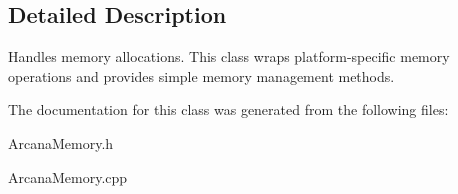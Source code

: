 \subsection{Detailed Description}
Handles memory allocations. This class wraps platform-\/specific memory operations and provides simple memory management methods. 

The documentation for this class was generated from the following files\+:\begin{DoxyCompactItemize}
\item 
Arcana\+Memory.\+h\item 
Arcana\+Memory.\+cpp\end{DoxyCompactItemize}
